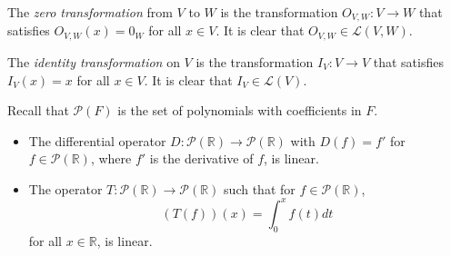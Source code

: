 \begin{example}
  The \emph{zero transformation} from $V$ to $W$ is the transformation
  $O_{V, W}: V \to W$ that satisfies $O_{V, W}(x) = 0_W$
  for all $x \in V$.
  It is clear that $O_{V, W} \in \mathcal{L}(V, W)$.
\end{example}
\begin{example}
  The \emph{identity transformation} on $V$ is the transformation
  $I_V: V \to V$ that satisfies $I_V(x) = x$ for all $x \in V$.
  It is clear that $I_{V} \in \mathcal{L}(V)$.
\end{example}
\begin{example}
  Recall that $\mathcal{P}(F)$ is the set of polynomials with coefficients in
  $F$.
  \begin{itemize}
    \item The differential operator
      $D: \mathcal{P}(\mathbb{R}) \to \mathcal{P}(\mathbb{R})$
      with $D(f) = f'$ for $f \in \mathcal{P}(\mathbb{R})$, where $f'$ is the
      derivative of $f$, is linear.
    \item The operator
      $T: \mathcal{P}(\mathbb{R}) \to \mathcal{P}(\mathbb{R})$ such that
      for $f \in \mathcal{P}(\mathbb{R})$,
      \begin{equation*}
        (T(f))(x) = \int_0^x f(t) dt
      \end{equation*}
      for all $x \in \mathbb{R}$, is linear.
  \end{itemize}
\end{example}

